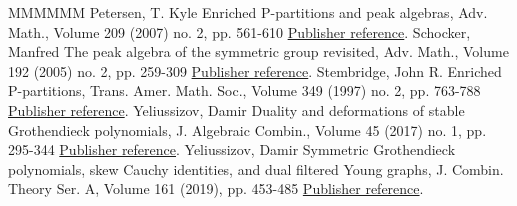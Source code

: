 \documentclass[11pt]{article}
\theoremstyle{definition}
\numberwithin{equation}{section}
\numberwithin{equation}{section}
\begin{document}
\begin{thebibliography}{MMMMMM}
 Petersen, T. Kyle Enriched P-partitions and peak algebras, Adv. Math., Volume 209 (2007) no. 2, pp. 561-610 \href{https://alco.centre-mersenne.org/articles/10.5802/alco.362/#Petersen}{Publisher reference}.
 Schocker, Manfred The peak algebra of the symmetric group revisited, Adv. Math., Volume 192 (2005) no. 2, pp. 259-309 \href{https://alco.centre-mersenne.org/articles/10.5802/alco.362/#Schocker}{Publisher reference}.
 Stembridge, John R. Enriched P-partitions, Trans. Amer. Math. Soc., Volume 349 (1997) no. 2, pp. 763-788 \href{https://alco.centre-mersenne.org/articles/10.5802/alco.362/#Stembridge1997a}{Publisher reference}.
 Yeliussizov, Damir Duality and deformations of stable Grothendieck polynomials, J. Algebraic Combin., Volume 45 (2017) no. 1, pp. 295-344 \href{https://alco.centre-mersenne.org/articles/10.5802/alco.362/#Yeliussizov2017}{Publisher reference}.
 Yeliussizov, Damir Symmetric Grothendieck polynomials, skew Cauchy identities, and dual filtered Young graphs, J. Combin. Theory Ser. A, Volume 161 (2019), pp. 453-485 \href{https://alco.centre-mersenne.org/articles/10.5802/alco.362/#Yeliussizov2019}{Publisher reference}.
\end{thebibliography}
\end{document}

